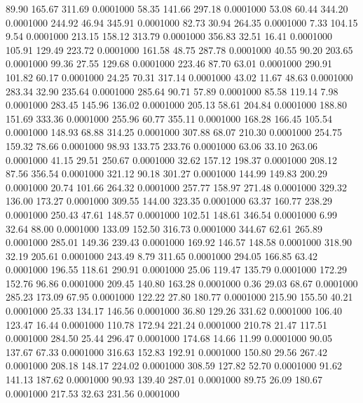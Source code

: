   89.90  165.67  311.69   0.0001000
  58.35  141.66  297.18   0.0001000
  53.08   60.44  344.20   0.0001000
 244.92   46.94  345.91   0.0001000
  82.73   30.94  264.35   0.0001000
   7.33  104.15    9.54   0.0001000
 213.15  158.12  313.79   0.0001000
 356.83   32.51   16.41   0.0001000
 105.91  129.49  223.72   0.0001000
 161.58   48.75  287.78   0.0001000
  40.55   90.20  203.65   0.0001000
  99.36   27.55  129.68   0.0001000
 223.46   87.70   63.01   0.0001000
 290.91  101.82   60.17   0.0001000
  24.25   70.31  317.14   0.0001000
  43.02   11.67   48.63   0.0001000
 283.34   32.90  235.64   0.0001000
 285.64   90.71   57.89   0.0001000
  85.58  119.14    7.98   0.0001000
 283.45  145.96  136.02   0.0001000
 205.13   58.61  204.84   0.0001000
 188.80  151.69  333.36   0.0001000
 255.96   60.77  355.11   0.0001000
 168.28  166.45  105.54   0.0001000
 148.93   68.88  314.25   0.0001000
 307.88   68.07  210.30   0.0001000
 254.75  159.32   78.66   0.0001000
  98.93  133.75  233.76   0.0001000
  63.06   33.10  263.06   0.0001000
  41.15   29.51  250.67   0.0001000
  32.62  157.12  198.37   0.0001000
 208.12   87.56  356.54   0.0001000
 321.12   90.18  301.27   0.0001000
 144.99  149.83  200.29   0.0001000
  20.74  101.66  264.32   0.0001000
 257.77  158.97  271.48   0.0001000
 329.32  136.00  173.27   0.0001000
 309.55  144.00  323.35   0.0001000
  63.37  160.77  238.29   0.0001000
 250.43   47.61  148.57   0.0001000
 102.51  148.61  346.54   0.0001000
   6.99   32.64   88.00   0.0001000
 133.09  152.50  316.73   0.0001000
 344.67   62.61  265.89   0.0001000
 285.01  149.36  239.43   0.0001000
 169.92  146.57  148.58   0.0001000
 318.90   32.19  205.61   0.0001000
 243.49    8.79  311.65   0.0001000
 294.05  166.85   63.42   0.0001000
 196.55  118.61  290.91   0.0001000
  25.06  119.47  135.79   0.0001000
 172.29  152.76   96.86   0.0001000
 209.45  140.80  163.28   0.0001000
   0.36   29.03   68.67   0.0001000
 285.23  173.09   67.95   0.0001000
 122.22   27.80  180.77   0.0001000
 215.90  155.50   40.21   0.0001000
  25.33  134.17  146.56   0.0001000
  36.80  129.26  331.62   0.0001000
 106.40  123.47   16.44   0.0001000
 110.78  172.94  221.24   0.0001000
 210.78   21.47  117.51   0.0001000
 284.50   25.44  296.47   0.0001000
 174.68   14.66   11.99   0.0001000
  90.05  137.67   67.33   0.0001000
 316.63  152.83  192.91   0.0001000
 150.80   29.56  267.42   0.0001000
 208.18  148.17  224.02   0.0001000
 308.59  127.82   52.70   0.0001000
  91.62  141.13  187.62   0.0001000
  90.93  139.40  287.01   0.0001000
  89.75   26.09  180.67   0.0001000
 217.53   32.63  231.56   0.0001000
